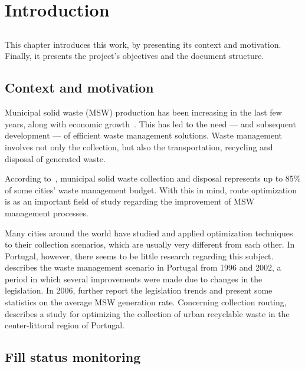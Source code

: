 \chapter{Introduction} \label{chap:intro}

\section*{}

This chapter introduces this work, by presenting its context and motivation.
Finally, it presents the project's objectives and the document structure.

\section{Context and motivation}
\label{section:context}

Municipal solid waste (MSW) production has been increasing in the last few
years, along with economic growth~\citep{McCarthy94}. This has led to the need
--- and subsequent development --- of efficient waste management solutions.
Waste management involves not only the collection, but also the transportation,
recycling and disposal of generated waste.

According to~\citet{Bhat1996}, municipal solid waste collection and disposal
represents up to 85\% of some cities' waste management budget. With this in
mind, route optimization is as an important field of study regarding the
improvement of MSW management processes.

Many cities around the world have studied and applied optimization techniques
to their collection scenarios, which are usually very different from each
other. In Portugal, however, there seems to be little research regarding this
subject. \citet{Passaro200397} describes the waste management scenario in
Portugal from 1996 and 2002, a period in which several improvements were made
due to changes in the legislation. In 2006, \citet{Magrinho20061477} further
report the legislation trends and present some statistics on the average MSW
generation rate. Concerning collection routing, \citet{Teixeira04} describes a
study for optimizing the collection of urban recyclable waste in the
center-littoral region of Portugal.




\section{Fill status monitoring}
\label{section:monitoring}

